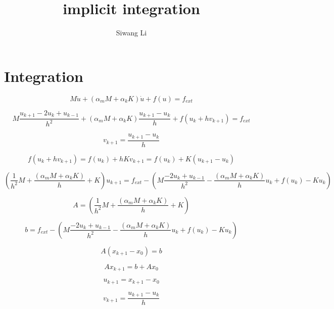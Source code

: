 \documentclass[9pt]{extarticle}
\author{Siwang Li}
\title{implicit integration}
\begin{document}
\maketitle

\setlength{\parskip}{0.5ex}

\section{Integration}
\begin{equation}
  M\ddot{u} + (\alpha_mM + \alpha_kK)\dot{u}+f(u) = f_{ext}
\end{equation}

\begin{equation}
  M \frac{u_{k+1}-2u_k+u_{k-1}}{h^2} + (\alpha_mM + \alpha_kK)\frac{u_{k+1}-u_{k}}{h}+f(u_{k}+hv_{k+1}) = f_{ext}
\end{equation}

\begin{equation}
  v_{k+1} = \frac{u_{k+1}-u_{k}}{h}
\end{equation}

\begin{equation}
  f(u_{k}+hv_{k+1}) = f(u_k) + hKv_{k+1} = f(u_k)+K({u_{k+1}-u_{k}})
\end{equation}

\begin{equation} 
  (\frac{1}{h^2}M + \frac{(\alpha_mM + \alpha_kK)}{h}+K)u_{k+1} = f_{ext}-(M\frac{-2u_k+u_{k-1}}{h^2}-\frac{(\alpha_mM + \alpha_kK)}{h}u_k+f(u_k)-Ku_k)
\end{equation}

\begin{equation}
  A = (\frac{1}{h^2}M + \frac{(\alpha_mM + \alpha_kK)}{h}+K)
\end{equation}

\begin{equation} 
  b = f_{ext}-(M\frac{-2u_k+u_{k-1}}{h^2}-\frac{(\alpha_mM + \alpha_kK)}{h}u_k+f(u_k)-Ku_k)
\end{equation}

\begin{equation}
  A (x_{k+1}-x_0) = b
\end{equation}

\begin{equation}
  A x_{k+1} = b+Ax_0
\end{equation}

\begin{equation}
  u_{k+1} = x_{k+1}-x_0
\end{equation}

\begin{equation}
  v_{k+1} = \frac{u_{k+1}-u_{k}}{h}
\end{equation}
\end{document}
